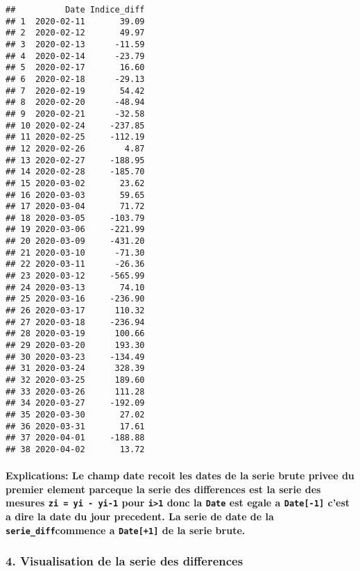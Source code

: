\documentclass[
]{article}
\begin{document}
\begin{verbatim}
##          Date Indice_diff
## 1  2020-02-11       39.09
## 2  2020-02-12       49.97
## 3  2020-02-13      -11.59
## 4  2020-02-14      -23.79
## 5  2020-02-17       16.60
## 6  2020-02-18      -29.13
## 7  2020-02-19       54.42
## 8  2020-02-20      -48.94
## 9  2020-02-21      -32.58
## 10 2020-02-24     -237.85
## 11 2020-02-25     -112.19
## 12 2020-02-26        4.87
## 13 2020-02-27     -188.95
## 14 2020-02-28     -185.70
## 15 2020-03-02       23.62
## 16 2020-03-03       59.65
## 17 2020-03-04       71.72
## 18 2020-03-05     -103.79
## 19 2020-03-06     -221.99
## 20 2020-03-09     -431.20
## 21 2020-03-10      -71.30
## 22 2020-03-11      -26.36
## 23 2020-03-12     -565.99
## 24 2020-03-13       74.10
## 25 2020-03-16     -236.90
## 26 2020-03-17      110.32
## 27 2020-03-18     -236.94
## 28 2020-03-19      100.66
## 29 2020-03-20      193.30
## 30 2020-03-23     -134.49
## 31 2020-03-24      328.39
## 32 2020-03-25      189.60
## 33 2020-03-26      111.28
## 34 2020-03-27     -192.09
## 35 2020-03-30       27.02
## 36 2020-03-31       17.61
## 37 2020-04-01     -188.88
## 38 2020-04-02       13.72
\end{verbatim}

\paragraph{\texorpdfstring{Explications: Le champ date recoit les dates
de la serie brute privee du premier element parceque la serie des
differences est la serie des mesures \texttt{zi\ =\ yi\ -\ yi-1} pour
\texttt{i\textgreater{}1} donc la \texttt{Date} est egale a
\texttt{Date{[}-1{]}} c'est a dire la date du jour precedent. La serie
de date de la \texttt{serie\_diff}commence a \texttt{Date{[}+1{]}} de la
serie
brute.}{Explications: Le champ date recoit les dates de la serie brute privee du premier element parceque la serie des differences est la serie des mesures zi = yi - yi-1 pour i\textgreater1 donc la Date est egale a Date{[}-1{]} c'est a dire la date du jour precedent. La serie de date de la serie\_diffcommence a Date{[}+1{]} de la serie brute.}}\label{explications-le-champ-date-recoit-les-dates-de-la-serie-brute-privee-du-premier-element-parceque-la-serie-des-differences-est-la-serie-des-mesures-zi-yi---yi-1-pour-i1-donc-la-date-est-egale-a-date-1-cest-a-dire-la-date-du-jour-precedent.-la-serie-de-date-de-la-serie_diffcommence-a-date1-de-la-serie-brute.}

\subsubsection{4. Visualisation de la serie des
differences}\label{visualisation-de-la-serie-des-differences}
\end{document}
